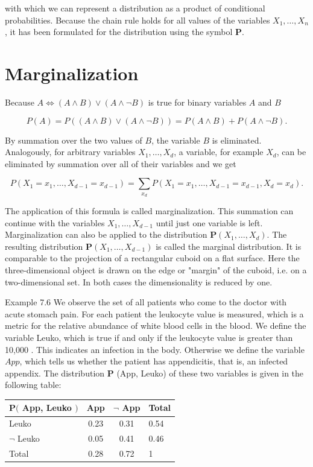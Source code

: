 \documentclass[10pt]{book}
\begin{document}
with which we can represent a distribution as a product of conditional probabilities. Because the chain rule holds for all values of the variables $X_{1}, \ldots, X_{n}$, it has been formulated for the distribution using the symbol $\boldsymbol{P}$.

\section*{Marginalization}
Because $A \Leftrightarrow(A \wedge B) \vee(A \wedge \neg B)$ is true for binary variables $A$ and $B$

$$
P(A)=P((A \wedge B) \vee(A \wedge \neg B))=P(A \wedge B)+P(A \wedge \neg B) .
$$

By summation over the two values of $B$, the variable $B$ is eliminated. Analogously, for arbitrary variables $X_{1}, \ldots, X_{d}$, a variable, for example $X_{d}$, can be eliminated by summation over all of their variables and we get

$$
P\left(X_{1}=x_{1}, \ldots, X_{d-1}=x_{d-1}\right)=\sum_{x_{d}} P\left(X_{1}=x_{1}, \ldots, X_{d-1}=x_{d-1}, X_{d}=x_{d}\right) .
$$

The application of this formula is called marginalization. This summation can continue with the variables $X_{1}, \ldots, X_{d-1}$ until just one variable is left. Marginalization can also be applied to the distribution $\boldsymbol{P}\left(X_{1}, \ldots, X_{d}\right)$. The resulting distribution $\boldsymbol{P}\left(X_{1}, \ldots, X_{d-1}\right)$ is called the marginal distribution. It is comparable to the projection of a rectangular cuboid on a flat surface. Here the three-dimensional object is drawn on the edge or "margin" of the cuboid, i.e. on a two-dimensional set. In both cases the dimensionality is reduced by one.

Example 7.6 We observe the set of all patients who come to the doctor with acute stomach pain. For each patient the leukocyte value is measured, which is a metric for the relative abundance of white blood cells in the blood. We define the variable Leuko, which is true if and only if the leukocyte value is greater than 10,000 . This indicates an infection in the body. Otherwise we define the variable $A p p$, which tells us whether the patient has appendicitis, that is, an infected appendix. The distribution $\boldsymbol{P}$ (App, Leuko) of these two variables is given in the following table:

\begin{center}
\begin{tabular}{lccl}
\hline
$\boldsymbol{P}($ App, Leuko $)$ & App & $\neg$ App & Total \\
\hline
Leuko & 0.23 & 0.31 & 0.54 \\
\hline
$\neg$ Leuko & 0.05 & 0.41 & 0.46 \\
\hline
Total & 0.28 & 0.72 & 1 \\
\hline
\end{tabular}
\end{center}
\end{document}
